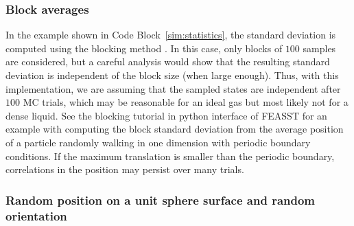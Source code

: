 \documentclass[
  9pt,
  bestpractices,
  pubversion,
]{livecoms}
\begin{document}
\subsubsection{\label{sec:block_av}Block averages}

In the example shown in Code Block~\ref{sim:statistics}, the standard deviation is computed using the blocking method \cite{flyvbjerg_error_1989}.
In this case, only blocks of $100$ samples are considered, but a careful analysis would show that the resulting standard deviation is independent of the block size (when large enough).
Thus, with this implementation, we are assuming that the sampled states are independent after $100$ MC trials, which may be reasonable for an ideal gas but most likely not for a dense liquid.
See the blocking tutorial in python interface of FEASST \cite{hatch_monte_2024} for an example with computing the block standard deviation from the average position of a particle randomly walking in one dimension with periodic boundary conditions.
If the maximum translation is smaller than the periodic boundary, correlations in the position may persist over many trials.

\begin{figure}

\end{figure}

\subsubsection{\label{sec:unit_sphere}Random position on a unit sphere surface and random orientation}
\end{document}
